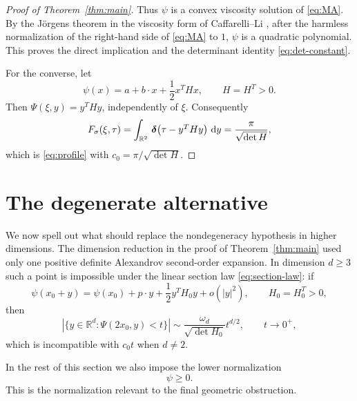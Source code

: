 \documentclass[11pt]{amsart}
\newcommand{\pvector}[1]{
  \begin{pmatrix}
    #1
  \end{pmatrix}}
\newcommand{\ddirac}[1]{
  \,\boldsymbol{\delta}\!\pvector{#1}\!}
\renewcommand{\d}{\,{\rm d}}
\def\R{\mathbb{R}}
\begin{document}
\begin{proof}[Proof of Theorem~\ref{thm:main}]
Thus $\psi$ is a convex viscosity solution of \eqref{eq:MA}.  By the
Jörgens theorem in the viscosity form of Caffarelli--Li
\cite[Theorem 1.1]{CL03}, after the harmless normalization of the right-hand
side of \eqref{eq:MA} to $1$, $\psi$ is a quadratic polynomial.  This proves
the direct implication and the determinant identity \eqref{eq:det-constant}.

For the converse, let
\[
    \psi(x)=a+b\cdot x+\frac12 x^THx,\qquad H=H^T>0.
\]
Then $\Psi(\xi,y)=y^THy$, independently of $\xi$.  Consequently
\[
    F_\sigma(\xi,\tau)
    =\int_{\R^2}\ddirac{\tau-y^THy}\,\d y
    =\frac{\pi}{\sqrt{\det H}},
\]
which is \eqref{eq:profile} with
$c_0=\pi/\sqrt{\det H}$.
\end{proof}

\section{The degenerate alternative}

We now spell out what should replace the nondegeneracy hypothesis in higher
dimensions.  The dimension reduction in the proof of Theorem~\ref{thm:main}
used only one positive definite Alexandrov second-order expansion.  In
dimension $d\geq 3$ such a point is impossible under the linear section law
\eqref{eq:section-law}: if
\[
    \psi(x_0+y)=\psi(x_0)+p\cdot y+\frac12 y^TH_0y+o(|y|^2),
    \qquad H_0=H_0^T>0,
\]
then
\[
    |\{y\in\R^d:\Psi(2x_0,y)<t\}|
    \sim \frac{\omega_d}{\sqrt{\det H_0}}t^{d/2},
    \qquad t\to0^+,
\]
which is incompatible with $c_0t$ when $d\neq 2$.

In the rest of this section we also impose the lower normalization
\[
    \psi\geq0.
\]
This is the normalization relevant to the final geometric obstruction.
\end{document}
